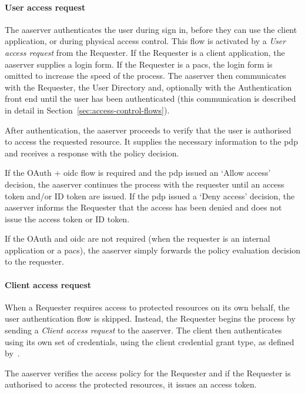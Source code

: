 \paragraph{User access request}
The \acrshort{aaserver} authenticates the user during sign in, before they can use the client application, or during physical access control. This flow is activated by a \textit{User access request} from the Requester. If the Requester is a client application, the \acrshort{aaserver} supplies a login form. If the Requester is a \acrshort{pacs}, the login form is omitted to increase the speed of the process. The \acrshort{aaserver} then communicates with the Requester, the User Directory and, optionally with the Authentication front end until the user has been authenticated (this communication is described in detail in Section~\ref{sec:access-control-flows}).

After authentication, the \acrshort{aaserver} proceeds to verify that the user is authorised to access the requested resource. It supplies the necessary information to the \acrshort{pdp} and receives a response with the policy decision.

If the OAuth + \acrshort{oidc} flow is required and the \acrshort{pdp} issued an `Allow access' decision, the \acrshort{aaserver} continues the process with the requester until an access token and/or ID token are issued. If the \acrshort{pdp} issued a `Deny access' decision, the \acrshort{aaserver} informs the Requester that the access has been denied and does not issue the access token or ID token. 

If the OAuth and \acrshort{oidc} are not required (when the requester is an internal application or a \acrshort{pacs}), the \acrshort{aaserver} simply forwards the policy evaluation decision to the requester.

\paragraph{Client access request}
When a Requester requires access to protected resources on its own behalf, the user authentication flow is skipped. Instead, the Requester begins the process by sending a \textit{Client access request} to the \acrshort{aaserver}. The client then authenticates using its own set of credentials, using the client credential grant type, as defined by~\cite{Hardt2012TheFramework}. 

The \acrshort{aaserver} verifies the access policy for the Requester and if the Requester is authorised to access the protected resources, it issues an access token.

